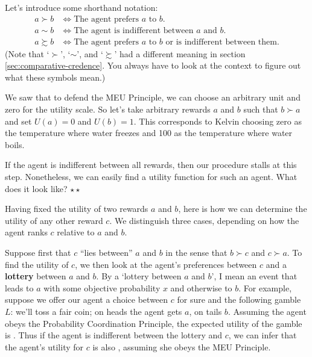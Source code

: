 Let's introduce some shorthand notation:
%
\begin{align*}
  a \succ b &\Leftrightarrow \text{The agent prefers $a$ to $b$}.\\
  a \sim b &\Leftrightarrow \text{The agent is indifferent between $a$ and $b$.}\\
  a \succsim b & \Leftrightarrow \text{The agent prefers $a$ to $b$ or is indifferent between them.}
\end{align*}
%
(Note that `$\succ$', `$\sim$', and `$\succsim$' had a different
meaning in section \ref{sec:comparative-credence}. You always have to
look at the context to figure out what these symbols mean.)

We saw that to defend the MEU Principle, we can choose an arbitrary
unit and zero for the utility scale. So let's take arbitrary rewards
$a$ and $b$ such that $b \succ a$ and set $U(a) = 0$ and $U(b) =
1$. This corresponds to Kelvin choosing zero as the temperature where
water freezes and 100 as the temperature where water boils. 

\begin{exercise}
  If the agent is indifferent between all rewards, then our procedure
  stalls at this step. Nonetheless, we can easily find a utility
  function for such an agent. What does it look like? $\star \star$
\end{exercise}

Having fixed the utility of two rewards $a$ and $b$, here is how we
can determine the utility of any other reward $c$. We distinguish
three cases, depending on how the agent ranks $c$ relative to $a$ and
$b$.

Suppose first that $c$ ``lies between'' $a$ and $b$ in the sense that
$b \succ c$ and $c \succ a$.  To find the utility of $c$, we then look
at the agent's preferences between $c$ and a \textbf{lottery} between
$a$ and $b$. By a `lottery between $a$ and $b$', I mean an event that
leads to $a$ with some objective probability $x$ and otherwise to
$b$. For example, suppose we offer our agent a choice between $c$ for
sure and the following gamble $L$: we'll toss a fair coin; on heads
the agent gets $a$, on tails $b$. Assuming the agent obeys the
Probability Coordination Principle, the expected utility of the gamble
is%
\cmnt{%
\[
  EU(L) = \nicefrac{1}{2} \times U(a) + \nicefrac{1}{2} \times U(b) =  
   \nicefrac{1}{2} \times 0 + \nicefrac{1}{2} \times 1 = \nicefrac{1}{2}. 
\]
} %
. Thus if the agent is indifferent between the lottery
and $c$, we can infer that the agent's utility for $c$ is also
, assuming she obeys the MEU Principle.

